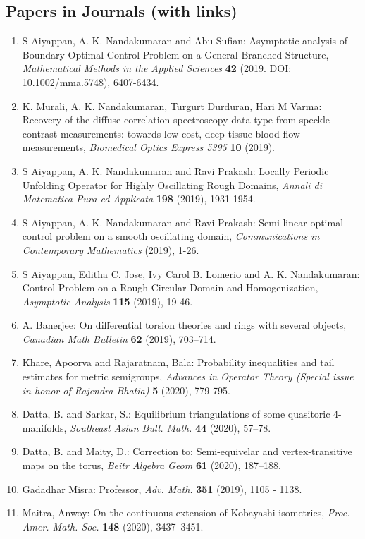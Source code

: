\subsection{Papers in Journals (with links)}

\begin{enumerate}
\item S Aiyappan, A. K. Nandakumaran and Abu Sufian: Asymptotic analysis of Boundary Optimal Control Problem on a General Branched Structure, \emph{Mathematical Methods in the Applied Sciences} {\bf 42} (2019. DOI: 10.1002/mma.5748), 6407-6434.
\item K. Murali, A. K. Nandakumaran, Turgurt Durduran, Hari M Varma: Recovery of the diffuse correlation spectroscopy data-type from speckle contrast measurements: towards low-cost, deep-tissue blood flow measurements, \emph{Biomedical Optics Express 5395} {\bf 10} (2019).
\item S Aiyappan, A. K. Nandakumaran and Ravi Prakash: Locally Periodic Unfolding Operator for Highly Oscillating Rough Domains, \emph{Annali di Matematica Pura ed Applicata} {\bf 198} (2019), 1931-1954.
\item S Aiyappan, A. K. Nandakumaran and Ravi Prakash: Semi-linear optimal control problem on a smooth oscillating domain, \emph{Communications in Contemporary Mathematics} {\bf } (2019), 1-26.
\item S Aiyappan, Editha C. Jose, Ivy Carol B. Lomerio and A. K. Nandakumaran: Control Problem on a Rough Circular Domain and Homogenization, \emph{Asymptotic Analysis} {\bf 115} (2019), 19-46.
\item A. Banerjee: On differential torsion theories and rings with several objects, \emph{Canadian Math Bulletin} {\bf 62} (2019), 703--714.
\item Khare, Apoorva and Rajaratnam, Bala: Probability inequalities and tail estimates for metric semigroups, \emph{Advances in Operator Theory (Special issue in honor of Rajendra Bhatia)} {\bf 5} (2020), 779-795.
\item Datta, B. and Sarkar, S.: Equilibrium triangulations of some quasitoric 4-manifolds, \emph{Southeast Asian Bull. Math.} {\bf 44} (2020), 57--78.
\item Datta, B. and Maity, D.: Correction to: Semi-equivelar and vertex-transitive maps on the torus, \emph{Beitr Algebra Geom} {\bf 61} (2020), 187--188.
\item Gadadhar Misra: Professor, \emph{Adv. Math.} {\bf 351} (2019), 1105 - 1138.
\item Maitra, Anwoy: On the continuous extension of Kobayashi isometries, \emph{Proc. Amer. Math. Soc.} {\bf 148} (2020), 3437--3451.

\end{enumerate}
